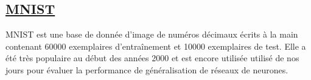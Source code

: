 \documentclass[12pt,letterpaper]{article}
\begin{document}
\subsection{\href{http://yann.lecun.com/exdb/mnist/}{MNIST}}

MNIST est une base de donnée d'image de numéros décimaux écrits à la main
contenant 60000 exemplaires d'entraînement et 10000 exemplaires de test. Elle a
été très populaire au début des années 2000 et est encore utilisée utilisé de
nos jours pour évaluer la performance de généralisation de réseaux de neurones.
\end{document}
